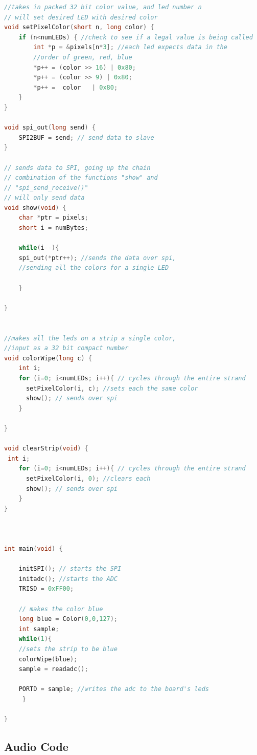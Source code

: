 \documentclass[11pt]{article}
\begin{document}
\begin{lstlisting}[language = C]
//takes in packed 32 bit color value, and led number n
// will set desired LED with desired color
void setPixelColor(short n, long color) {
    if (n<numLEDs) { //check to see if a legal value is being called
        int *p = &pixels[n*3]; //each led expects data in the 
        //order of green, red, blue 
        *p++ = (color >> 16) | 0x80; 
        *p++ = (color >> 9) | 0x80;
        *p++ =  color   | 0x80;
    }
}

void spi_out(long send) {
	SPI2BUF = send; // send data to slave
}

// sends data to SPI, going up the chain
// combination of the functions "show" and
// "spi_send_receive()"
// will only send data
void show(void) {
    char *ptr = pixels;
    short i = numBytes;

    while(i--){
    spi_out(*ptr++); //sends the data over spi, 
    //sending all the colors for a single LED

    }

}


//makes all the leds on a strip a single color, 
//input as a 32 bit compact number
void colorWipe(long c) {
    int i;
    for (i=0; i<numLEDs; i++){ // cycles through the entire strand
      setPixelColor(i, c); //sets each the same color
      show(); // sends over spi
    }

}

void clearStrip(void) {
 int i;
    for (i=0; i<numLEDs; i++){ // cycles through the entire strand
      setPixelColor(i, 0); //clears each
      show(); // sends over spi
    }
}
 


int main(void) {
    
    initSPI(); // starts the SPI
    initadc(); //starts the ADC
    TRISD = 0xFF00;
   
    // makes the color blue
    long blue = Color(0,0,127);
    int sample;
    while(1){
    //sets the strip to be blue
    colorWipe(blue);
    sample = readadc();

    PORTD = sample; //writes the adc to the board's leds
     }
    
}


\end{lstlisting}

\subsection{Audio Code}
\end{document}
